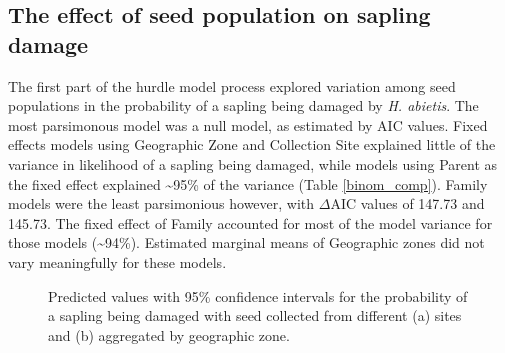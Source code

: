 \documentclass[a4paper, 11pt]{article}
\begin{document}


\subsection*{The effect of seed population on sapling damage}

The first part of the hurdle model process explored variation among seed populations in the probability of a sapling being damaged by \textit{H. abietis}. The most parsimonous model was a null model, as estimated by AIC values. Fixed effects models using Geographic Zone and Collection Site explained little of the variance in likelihood of a sapling being damaged, while models using Parent as the fixed effect explained \textasciitilde{}95\% of the variance (Table \ref{binom_comp}). Family models were the least parsimonious however, with $\Delta$AIC values of 147.73 and 145.73. The fixed effect of Family accounted for most of the model variance for those models (\textasciitilde{}94\%). Estimated marginal means of Geographic zones did not vary meaningfully for these models. 

\begin{figure}[H]
\centering
	\caption{Predicted values with 95\% confidence intervals for the probability of a sapling being damaged with seed collected from different (a) sites and (b) aggregated by geographic zone.}
	\label{pred_binom}
\end{figure}
\end{document}
